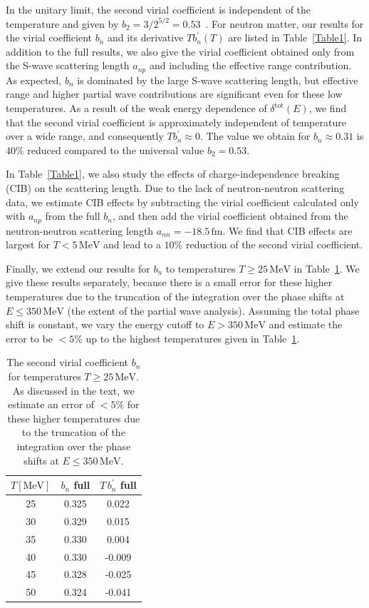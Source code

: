 \documentclass[aps,prc,twocolumn,showpacs,showkeys,amsmath,amssymb]{revtex4}
\newcommand{\fm}{\, \text{fm}}
\newcommand{\mev}{\, \text{MeV}}
\begin{document}
In the unitary limit, the second virial coefficient is independent of
the temperature and given by $b_2 = 3/2^{5/2} = 0.53$~\cite{Ho1}. For neutron 
matter, our results for the virial coefficient $b_n$ and its derivative
$T b_n^\prime(T)$ are listed in Table~\ref{Table1}. In addition to the 
full results, we also give the virial coefficient obtained only from
the S-wave scattering length $a_{np}$ and including the effective range
contribution. As expected, $b_n$ is dominated by the large S-wave 
scattering length, but effective range and higher partial wave 
contributions are significant even for these low temperatures.
As a result of the weak energy dependence of $\delta^{\text{tot}}(E)$,
we find that the second virial coefficient is approximately independent 
of temperature over a wide range, and consequently 
$T b_n^\prime \approx 0$. The value we obtain for 
$b_n \approx 0.31$ is $40 \%$ reduced compared to the universal value 
$b_2 = 0.53$. 

In Table~\ref{Table1}, we also 
study the effects of charge-independence breaking (CIB) 
on the scattering length. Due to the lack of neutron-neutron scattering
data, we estimate CIB effects by subtracting the virial coefficient
calculated only with $a_{np}$ from the full $b_n$, and then add the 
virial coefficient obtained from the neutron-neutron scattering 
length $a_{nn} = -18.5 \fm$. We find that CIB effects are largest for 
$T < 5 \mev$ and lead to a $10 \%$ reduction of the second virial 
coefficient.

Finally, we extend our results for $b_n$ to temperatures $T \geqslant
25 \mev$ in Table~\ref{Table2}. We give these results separately, because 
there is a small error for these higher temperatures due to the truncation of 
the integration over the phase shifts at $E \leqslant 350 \mev$ (the
extent of the partial wave analysis). Assuming
the total phase shift is constant, we vary the energy
cutoff to $E > 350 \mev$ and estimate the error to be $< 5 \%$ 
up to the highest temperatures given in Table~\ref{Table2}.

\begin{table}[t]
\caption{The second virial coefficient $b_n$ for temperatures $T \geqslant
25 \mev$. As discussed in the text, we estimate an error of $< 5 \%$ 
for these higher temperatures due to the truncation of the integration 
over the phase shifts at $E \leqslant 350 \mev$.}
\label{Table2}
\begin{ruledtabular}
\begin{tabular}{c|cc}
$T [\text{MeV}]$ & $b_n$ full & $T \, b_n^\prime$ full \\[0.2mm] \hline
25 & 0.325 & 0.022 \\[0.2mm]
30 & 0.329 & 0.015 \\[0.2mm]
35 & 0.330 & 0.004 \\[0.2mm]
40 & 0.330 & -0.009 \\[0.2mm]
45 & 0.328 & -0.025 \\[0.2mm]
50 & 0.324 & -0.041 \\
\end{tabular} 
\end{ruledtabular}
\end{table}
\end{document}
